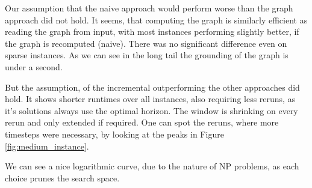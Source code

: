 Our assumption that the naive approach would perform worse than the graph approach did not hold. It seems, that computing the graph is similarly efficient as reading the graph from input, with most instances performing slightly better, if the graph is recomputed (naive). There was no significant difference even on sparse instances. As we can see in the long tail the grounding of the graph is under a second.

But the assumption, of the incremental outperforming the other approaches did hold. It shows shorter runtimes over all instances, also requiring less reruns, as it's solutions always use the optimal horizon. The window is shrinking on every rerun and only extended if required. One can spot the reruns, where more timesteps were necessary, by looking at the peaks in Figure \ref{fig:medium_instance}.

We can see a nice logarithmic curve, due to the nature of NP problems, as each choice prunes the search space.